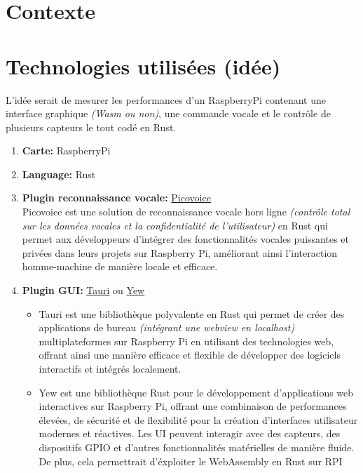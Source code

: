 \section{Contexte}




\section{Technologies utilisées (idée)}

L'idée serait de mesurer les performances d'un RaspberryPi contenant une interface graphique \textit{(Wasm ou non)}, une commande vocale et le contrôle de plusieurs capteurs le tout codé en Rust.
\vspace{.3cm}

\begin{enumerate}
    \item \textbf{Carte:} RaspberryPi 
    \item \textbf{Language:} Rust 
    \item \textbf{Plugin reconnaissance vocale:} \href{https://picovoice.ai/}{Picovoice} \\
            Picovoice est une solution de reconnaissance vocale hors ligne \textit{(contrôle total sur les données vocales et la confidentialité de l'utilisateur)} en Rust qui permet aux développeurs d'intégrer 
            des fonctionnalités vocales puissantes et privées dans leurs projets sur Raspberry Pi, améliorant ainsi l'interaction homme-machine de manière locale et efficace. 

    \item \textbf{Plugin GUI:} \href{https://tauri.app/}{Tauri} ou \href{https://yew.rs/}{Yew}

        \begin{itemize}
            \item Tauri est une bibliothèque polyvalente en Rust qui permet de créer des applications de bureau \textit{(intégrant une webview en localhost)}
            multiplateformes sur Raspberry Pi en utilisant des technologies web, offrant ainsi une manière efficace et flexible de développer des logiciels interactifs et intégrés localement.

            \item  Yew est une bibliothèque Rust pour le développement d'applications web interactives sur Raspberry Pi, 
            offrant une combinaison de performances élevées, de sécurité et de flexibilité pour la création d'interfaces utilisateur modernes et réactives. Les UI peuvent interagir avec des capteurs, des dispositifs GPIO et d'autres fonctionnalités matérielles de manière fluide.
            De plus, cela permettrait d'éxploiter le WebAssembly en Rust sur RPI 
        \end{itemize}



\end{enumerate}
